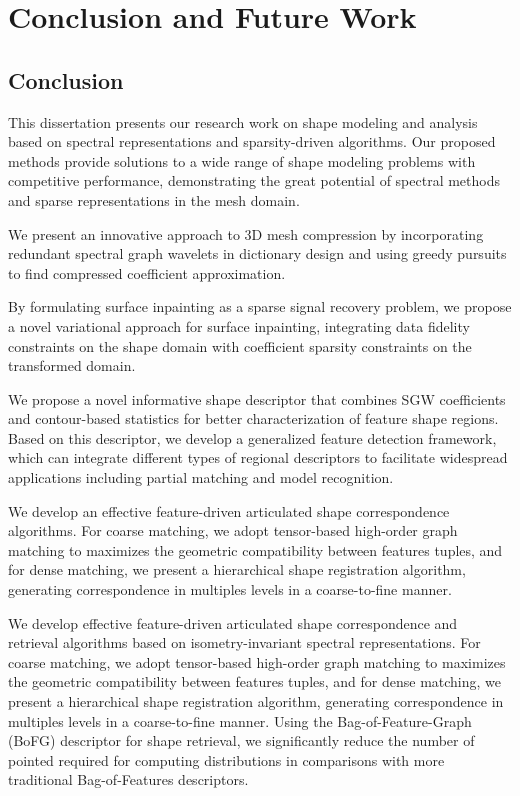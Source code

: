 \chapter{Conclusion and Future Work}

\section{Conclusion}
This dissertation presents our research work on shape modeling and 
analysis based on spectral representations and sparsity-driven algorithms. 
Our proposed methods provide solutions to a wide range of shape modeling 
problems with competitive performance, demonstrating the great potential
of spectral methods and sparse representations in the mesh domain.

We present an innovative approach to 3D mesh compression
by incorporating redundant spectral graph wavelets in dictionary design and using
greedy pursuits to find compressed coefficient approximation.

By formulating surface inpainting as a sparse signal recovery problem,
we propose a novel variational approach for surface inpainting, integrating data fidelity
constraints on the shape domain with coefficient sparsity constraints on the
transformed domain.

We propose a novel informative shape descriptor that combines SGW coefficients and
contour-based statistics for better characterization of feature shape regions. Based on
this descriptor, we develop a generalized feature detection framework, which can integrate different
types of regional descriptors to facilitate widespread applications including partial matching and
model recognition.

We develop an effective feature-driven articulated shape correspondence
algorithms. For coarse matching, we adopt
tensor-based high-order graph matching to maximizes the
geometric compatibility between features tuples, and for dense matching,
we present a hierarchical shape registration algorithm, generating
correspondence in multiples levels in a coarse-to-fine manner.

We develop effective feature-driven articulated shape
correspondence and retrieval algorithms based on 
isometry-invariant spectral representations. For coarse 
matching, we adopt tensor-based high-order graph matching to 
maximizes the geometric compatibility between features tuples, 
and for dense matching, we present a hierarchical shape 
registration algorithm, generating correspondence in multiples 
levels in a coarse-to-fine manner. Using the Bag-of-Feature-Graph (BoFG) 
descriptor for shape retrieval, we significantly reduce the number of 
pointed required for computing distributions in comparisons with 
more traditional Bag-of-Features descriptors. 

